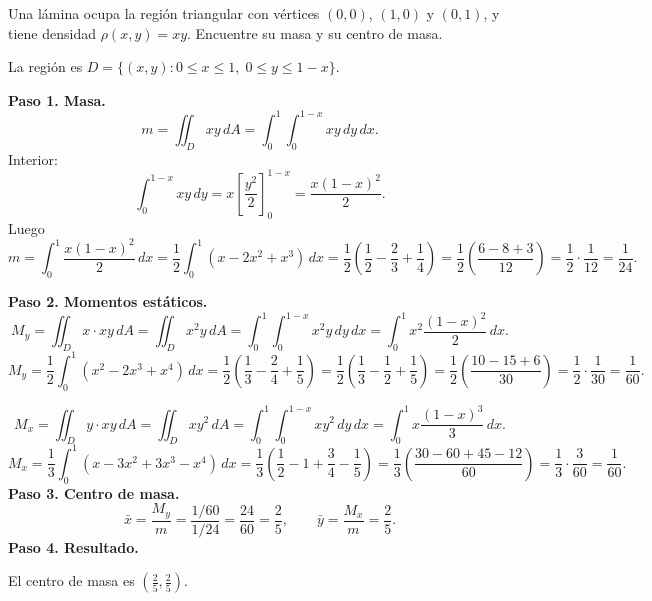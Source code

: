 \begin{example}
Una lámina ocupa la región triangular con vértices \((0,0)\), \((1,0)\) y \((0,1)\), y tiene densidad \(\rho(x,y)=xy\). Encuentre su masa y su centro de masa.
\begin{myproof}
La región es \(D=\{(x,y):0\le x\le 1,\;0\le y\le 1-x\}\).

\textbf{Paso 1. Masa.}
\[
m=\iint_D xy\,dA
= \int_0^1\int_0^{1-x} xy\,dy\,dx.
\]
Interior:
\[
\int_0^{1-x} xy\,dy = x\left[\frac{y^2}{2}\right]_0^{1-x}
= \frac{x(1-x)^2}{2}.
\]
Luego
\[
m=\int_0^1 \frac{x(1-x)^2}{2}\,dx
= \frac{1}{2}\int_0^1 (x-2x^2+x^3)\,dx
= \frac{1}{2}\left(\frac{1}{2}-\frac{2}{3}+\frac{1}{4}\right)
= \frac{1}{2}\left(\frac{6-8+3}{12}\right)
= \frac{1}{2}\cdot\frac{1}{12}=\frac{1}{24}.
\]

\textbf{Paso 2. Momentos estáticos.}
\[
M_y = \iint_D x\cdot xy\,dA = \iint_D x^2 y\,dA
= \int_0^1\int_0^{1-x} x^2 y\,dy\,dx
= \int_0^1 x^2\frac{(1-x)^2}{2}\,dx.
\]
\[
M_y = \frac{1}{2}\int_0^1 (x^2-2x^3+x^4)\,dx
= \frac{1}{2}\left(\frac{1}{3}-\frac{2}{4}+\frac{1}{5}\right)
= \frac{1}{2}\left(\frac{1}{3}-\frac{1}{2}+\frac{1}{5}\right)
= \frac{1}{2}\left(\frac{10-15+6}{30}\right)
= \frac{1}{2}\cdot\frac{1}{30}=\frac{1}{60}.
\]

\[
M_x = \iint_D y\cdot xy\,dA = \iint_D x y^2\,dA
= \int_0^1\int_0^{1-x} x y^2\,dy\,dx
= \int_0^1 x\frac{(1-x)^3}{3}\,dx.
\]
\[
M_x = \frac{1}{3}\int_0^1 (x-3x^2+3x^3-x^4)\,dx
= \frac{1}{3}\left(\frac{1}{2}-1+\frac{3}{4}-\frac{1}{5}\right)
= \frac{1}{3}\left(\frac{30-60+45-12}{60}\right)
= \frac{1}{3}\cdot\frac{3}{60}=\frac{1}{60}.
\]
\textbf{Paso 3. Centro de masa.}
\[
\bar{x}=\frac{M_y}{m}=\frac{1/60}{1/24}=\frac{24}{60}=\frac{2}{5},\qquad
\bar{y}=\frac{M_x}{m}=\frac{2}{5}.
\]
\textbf{Paso 4. Resultado.}

El centro de masa es \(\boxed{\left(\frac{2}{5},\frac{2}{5}\right)}\).
\end{myproof}
\end{example}

